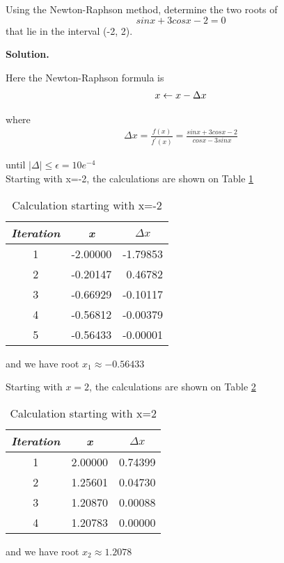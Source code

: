 \begin{exercise}{5} %
Using the Newton-Raphson method, determine the two roots of $$sinx + 3cosx-2 = 0$$ that lie in the interval (-2, 2).

\textbf{Solution.}

Here the Newton-Raphson formula is\\
\begin{align}
\notag
x \leftarrow x - \Delta x  
\end{align}

where
\begin{align}
\Delta x = \frac{f(x)}{f^\prime(x)} = \frac{sinx + 3cosx-2}{cosx-3sinx}
\end{align}

until $|\Delta| \leq \epsilon = 10e^{-4}$\\

Starting with x=-2, the calculations are shown on 
Table \ref{calculation1}

\begin{table}[h]
\centering
\begin{tabular}{|c|r|r|}
\hline
\textit{\textbf{Iteration}} & \multicolumn{1}{c|}{\textit{\textbf{x}}} & \multicolumn{1}{c|}{\textit{\textbf{$\Delta x$}}} \\ \hline
1 & -2.00000 & -1.79853 \\ \hline
2 & -0.20147 & 0.46782 \\ \hline
3 & -0.66929 & -0.10117 \\ \hline
4 & -0.56812 & -0.00379 \\ \hline
5 & -0.56433 & -0.00001 \\ \hline
\end{tabular}
\caption{Calculation starting with x=-2}
\label{calculation1}
\end{table}

and we have root $x_1 \approx -0.56433$

Starting with $x=2$, the calculations are shown on Table \ref{calculation2}

\begin{table}[h]
\centering
\begin{tabular}{|c|r|r|}
\hline
\textit{\textbf{Iteration}} & \multicolumn{1}{c|}{\textit{\textbf{x}}} & \multicolumn{1}{c|}{\textit{\textbf{$\Delta x$}}} \\ \hline
1 & 2.00000 & 0.74399 \\ \hline
2 & 1.25601 & 0.04730 \\ \hline
3 & 1.20870 & 0.00088 \\ \hline
4 & 1.20783 & 0.00000 \\ \hline
\end{tabular}
\caption{Calculation starting with x=2}
\label{calculation2}
\end{table}
and we have root $x_2 \approx 1.2078$

\end{exercise}



